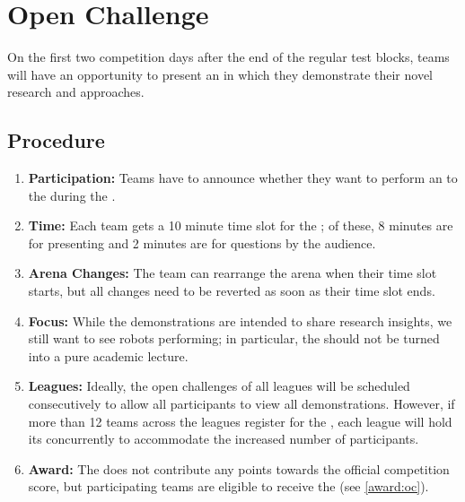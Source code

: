 \section{Open Challenge}\label{sec:rules:openchallenge}

On the first two competition days after the end of the regular test blocks, teams will have an opportunity to present an \OpenChallenge{} in which they demonstrate their novel research and approaches.

\subsection{Procedure}
\label{sec:rules:ocprocedure}
\begin{enumerate}
	\item \textbf{Participation:} Teams have to announce whether they want to perform an \OpenChallenge{} to the  during the \SetupDays{}.
	\item \textbf{Time:} Each team gets a 10 minute time slot for the \OpenChallenge; of these, 8 minutes are for presenting and 2 minutes are for questions by the audience.
	\item \textbf{Arena Changes:} The team can rearrange the arena when their time slot starts, but all changes need to be reverted as soon as their time slot ends.
	\item \textbf{Focus:} While the demonstrations are intended to share research insights, we still want to see robots performing; in particular, the \OpenChallenge{} should not be turned into a pure academic lecture.
	\item \textbf{Leagues:} Ideally, the open challenges of all \AtHome{} leagues will be scheduled consecutively to allow all participants to view all demonstrations. 
	However, if more than 12 teams across the leagues register for the \OpenChallenge{}, each league will hold its \OpenChallenge{} concurrently to accommodate the increased number of participants.
	
	\item \textbf{Award:} The \OpenChallenge{} does not contribute any points towards the official competition score, but participating teams are eligible to receive the \OCAward{} (see \ref{award:oc}).
\end{enumerate}
